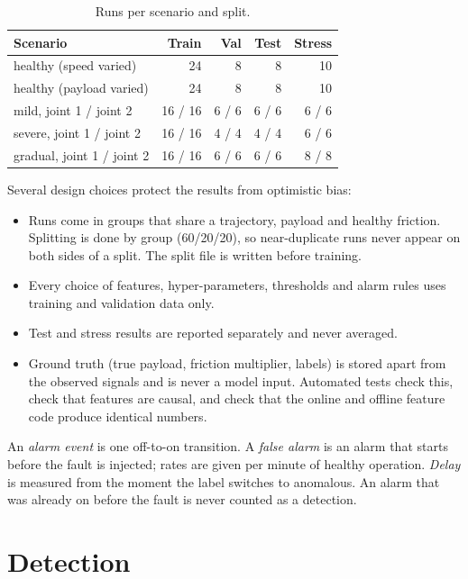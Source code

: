 \documentclass[11pt,a4paper]{article}
\begin{document}
\begin{table}[h]
\centering
\caption{Runs per scenario and split.}
\begin{tabular}{lrrrr}
\toprule
Scenario & Train & Val & Test & Stress \\
\midrule
healthy (speed varied) & 24 & 8 & 8 & 10 \\
healthy (payload varied) & 24 & 8 & 8 & 10 \\
mild, joint 1 / joint 2 & 16 / 16 & 6 / 6 & 6 / 6 & 6 / 6 \\
severe, joint 1 / joint 2 & 16 / 16 & 4 / 4 & 4 / 4 & 6 / 6 \\
gradual, joint 1 / joint 2 & 16 / 16 & 6 / 6 & 6 / 6 & 8 / 8 \\
\bottomrule
\end{tabular}
\end{table}

\noindent Several design choices protect the results from optimistic bias:
\begin{itemize}
  \item Runs come in groups that share a trajectory, payload and healthy friction. Splitting is done by group (60/20/20),
        so near-duplicate runs never appear on both sides of a split. The split file is written before training.
  \item Every choice of features, hyper-parameters, thresholds and alarm rules uses training and validation data only.
  \item Test and stress results are reported separately and never averaged.
  \item Ground truth (true payload, friction multiplier, labels) is stored apart from the observed signals and is never
        a model input. Automated tests check this, check that features are causal, and check that the online and
        offline feature code produce identical numbers.
\end{itemize}

\noindent An \emph{alarm event} is one off-to-on transition. A \emph{false alarm} is an alarm that starts before the
fault is injected; rates are given per minute of healthy operation. \emph{Delay} is measured from the moment the label
switches to anomalous. An alarm that was already on before the fault is never counted as a detection.

\section{Detection}
\end{document}
